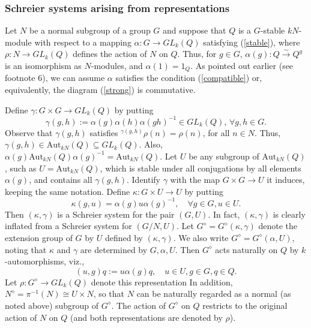 \documentclass[11pt,leqno,amscd,amssymb,verbatim, url]{amsart}
\theoremstyle{definition}
\numberwithin{equation}{thm}
\begin{document}
\subsubsection{Schreier systems arising from representations }\label{SchreirRep} Let $N$ be a normal subgroup of a group $G$ and suppose that
$Q$ is a $G$-stable $kN$-module with respect to a mapping $\alpha:G\to GL_k(Q)$ satisfying (\ref{stable}), where $\rho:N\to GL_k(Q)$
defines the action of $N$ on $Q$. Thus, for $g\in G$, $\alpha(g):Q\overset\sim\to
Q^g$ is an isomorphism as $N$-modules, and $\alpha(1)=1_Q$. As pointed out earlier (see footnote 6), we can assume $\alpha$ satisfies the condition (\ref{compatible}) or,
equivalently, the diagram (\ref{strong}) is commutative.

Define $\gamma:G\times G\to GL_k(Q)$ by putting
\begin{equation}\label{repfactorset}
\gamma(g,h):=\alpha(g)\alpha(h)\alpha(gh)^{-1}\in GL_k(Q),\,\forall g,h\in G.\end{equation}
 Observe that $\gamma(g,h)$ satisfies $^{\gamma(g,h)}\rho(n)=\rho(n)$,
for all $n\in N$. Thus, $\gamma(g,h)\in \text{Aut}_{kN}(Q)\subseteq GL_k(Q)$.  Also, $\alpha(g)\text{Aut}_{kN}(Q)\alpha(g)^{-1}=
\text{Aut}_{kN}(Q)$. Let $U$ be any subgroup of $\text{Aut}_{kN}(Q)$, such as $U=\text{Aut}_{kN}(Q)$, which is stable under all
conjugations by all elements $\alpha(g)$, and contains all $\gamma(g,h)$. Identify $\gamma$ with the map
$G\times G\to U$ it induces, keeping the same notation. Define $\kappa:G\times U\to U$ by
putting
\begin{equation}\label{kappadefined}\kappa(g,u)=
\alpha(g)u\alpha(g)^{-1},\quad\forall g\in G, u\in U.\end{equation}
 Then $(\kappa,\gamma)$ is a Schreier system for the pair $(G,U)$. In fact,
$(\kappa,\gamma)$ is clearly inflated from a Schreier system for $(G/N,U)$. Let $G^\diamond=G^\diamond(\kappa,\gamma)$ denote the extension group of $G$ by $U$ defined
by $(\kappa,\gamma)$. We also write $G^\diamond=G^\diamond(\alpha,U)$, noting that $\kappa$ and
$\gamma$ are determined by $G,\alpha,U$. Then $G^\diamond$ acts naturally on $Q$ by $k$-automorphisms, viz., 
$$(u,g)q:=u\alpha(g)q,\quad u\in U,g\in G,
q\in Q.$$
 Let $\rho:G^\diamond\to GL_k(Q)$ denote this representation
In addition, $N^\diamond=\pi^{-1}(N)\cong U\times N$, so that $N$ can be naturally regarded as a 
normal (as noted above) subgroup of $G^\diamond$. The
action of $G^\diamond$ on $Q$ restricts to the original action of $N$ on $Q$ (and both representations are denoted by $\rho$).
\end{document}
